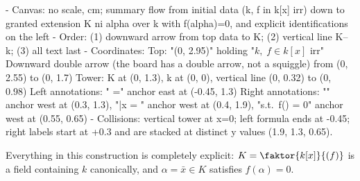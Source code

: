 \begin{content}
\begin{hidden}
- Canvas: no scale, cm; summary flow from initial data (k, f in k[x] irr) down to granted extension K ni alpha over k with f(alpha)=0, and explicit identifications on the left
- Order: (1) downward arrow from top data to K; (2) vertical line K--k; (3) all text last
- Coordinates:
  Top: "(0, 2.95)" holding "$k, \; f \in k[x] \text{ irr}$"
  Downward double arrow (the board has a double arrow, not a squiggle) from (0, 2.55) to (0, 1.7)
  Tower: K at (0, 1.3), k at (0, 0), vertical line (0, 0.32) to (0, 0.98)
  Left annotations: " =" anchor east at (-0.45, 1.3)
  Right annotations: "\ni \alpha" anchor west at (0.3, 1.3), "\bar{x} = \alpha" anchor west at (0.4, 1.9), "s.t.\ f(\alpha) = 0" anchor west at (0.55, 0.65)
- Collisions: vertical tower at x=0; left formula ends at -0.45; right labels start at +0.3 and are stacked at distinct y values (1.9, 1.3, 0.65).
\end{hidden}
\begin{center}
\end{center}

Everything in this construction is completely explicit: $K = \faktor{k[x]}{(f)}$ is a field containing $k$ canonically, and $\alpha = \bar{x} \in K$ satisfies $f(\alpha) = 0$.
\end{content}

